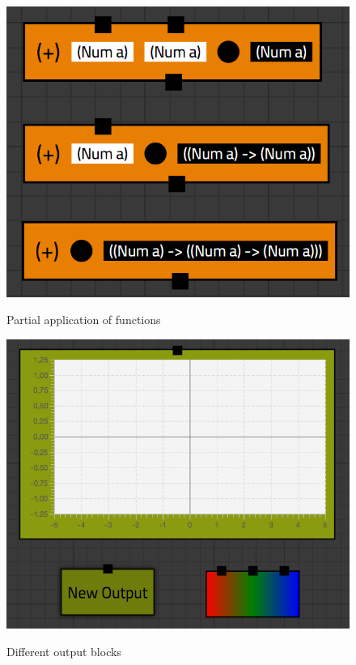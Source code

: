 \begin{figure}[p]
	\centering
	\includegraphics[scale=0.5]{Images/blocks-bowties}
	\label{fig:blocks-bowties}
	\caption{Partial application of functions}
\end{figure}

\begin{figure}[p]
	\centering
	\includegraphics[scale=0.5]{Images/blocks-outputs}
	\label{fig:blocks-outputs}
	\caption{Different output blocks}
\end{figure}

